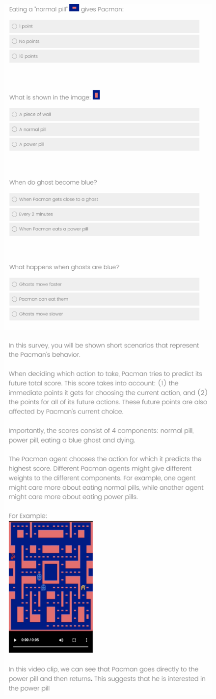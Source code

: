 \begin{figure}[t]
\centering
\includegraphics[width=0.7\linewidth]{domain_q.png}
\end{figure}
\begin{figure}[t]
\centering
\includegraphics[width=0.7\linewidth]{survey.png}
\end{figure}

